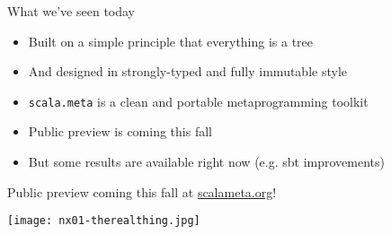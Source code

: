 \documentclass[svgnames,dvipsnames,hyperref={bookmarks=false},usepdftitle=false]{beamer}
\begin{document}
\begin{frame}{What we've seen today}
\begin{itemize}
\item Built on a simple principle that everything is a tree
\item And designed in strongly-typed and fully immutable style
\item \texttt{scala.meta} is a clean and portable metaprogramming toolkit
\item Public preview is coming this fall
\item But some results are available right now (e.g. sbt improvements)
\end{itemize}
\end{frame}

\begin{frame}[c, fragile]{Public preview coming this fall at \href{http://scalameta.org/}{scalameta.org}!}
\begin{center}
\texttt{[image: nx01-therealthing.jpg]}\\
\end{center}
\end{frame}
\end{document}
